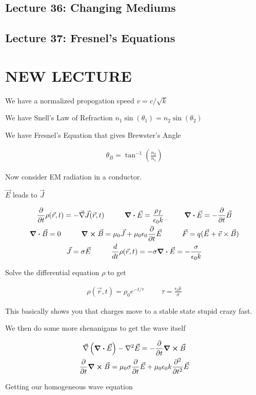 \documentclass[fleqn]{report}
\newcommand{\hp}{\hspace{1cm}}
\newcommand{\del}{\partial}
\newcommand{\equations} [1] {
\begin{gather*}
#1
\end{gather*}
}
\begin{document}
\subsection{Lecture 36: Changing Mediums}

\subsection{Lecture 37: Fresnel's Equations}


\section{NEW LECTURE}

We have a normalized propogation speed $v = c / \sqrt{k}$ 

We have Snell's Law of Refraction $n_1 \sin(\theta_1) = n_2 \sin(\theta_2)$

We have Fresnel's Equation that gives Brewster's Angle 
\equations{
    \theta_B = \tan^{-1}(\frac{n_2}{n_1})
}

Now
consider EM radiation in a conductor. 

$\vec E$ leads to $\vec J$ 

\equations{
    \frac{\del}{\del t} \rho(\vec r, t)
    =
    - \vec \nabla \vec J(\vec r, t)
    \hp 
    \div \vec E = \frac{\rho_{f}}{\epsilon_0 k}
    \hp
    \div \vec E 
    =
    - \frac{\del}{\del t} \vec B 
    \\ 
    \div \vec B = 0
    \hp 
    \curl \vec B = \mu_0 \vec J + \mu_0 \epsilon_0 \frac{\del}{\del t} \vec E 
    \hp 
    \vec F = q(\vec E + \vec v \times \vec B)
    \\
    \vec J = \sigma \vec E 
    \hp 
    \frac{d}{dt} \rho(\vec r, t) 
    = 
    - \sigma \div \vec E = -\frac{\sigma}{\epsilon_0 k}
}

Solve the differential equation $\rho$ to get 
\equations{
    \rho(\vec r, t)
    =
    \rho_0 e^{-t/\tau}
    \hp 
    \tau = \frac{\epsilon_0 k}{\sigma}
}

This basically shows you that charges move to a stable state stupid crazy fast. 

We then do some more shenanigans to get the wave itself 
\equations{
    \vec \nabla 
    \left(
        \div \vec E 
    \right)
    -
    \nabla^2 \vec E 
    =
    -
    \frac{\del}{\del t}
    \curl \vec B 
    \\
    \frac{\del}{\del t}
    \curl \vec B 
    =
    \mu_0 \sigma \frac{\del}{\del t}
    \vec E 
    +
    \mu_0 \epsilon_0 k \frac{\del^2}{\del t^2} \vec E 
}
Getting our homogeneous wave equation 
\end{document}
